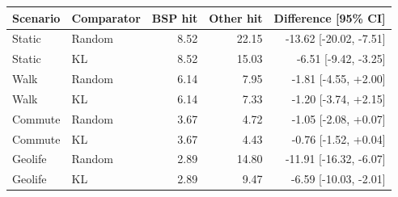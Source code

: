 \begin{tabular}{llrrr}
\toprule
Scenario & Comparator & BSP hit & Other hit & Difference [95\% CI] \\
\midrule
Static & Random & 8.52 & 22.15 & -13.62 [-20.02, -7.51] \\
Static & KL & 8.52 & 15.03 & -6.51 [-9.42, -3.25] \\
Walk & Random & 6.14 & 7.95 & -1.81 [-4.55, +2.00] \\
Walk & KL & 6.14 & 7.33 & -1.20 [-3.74, +2.15] \\
Commute & Random & 3.67 & 4.72 & -1.05 [-2.08, +0.07] \\
Commute & KL & 3.67 & 4.43 & -0.76 [-1.52, +0.04] \\
Geolife & Random & 2.89 & 14.80 & -11.91 [-16.32, -6.07] \\
Geolife & KL & 2.89 & 9.47 & -6.59 [-10.03, -2.01] \\
\bottomrule
\end{tabular}